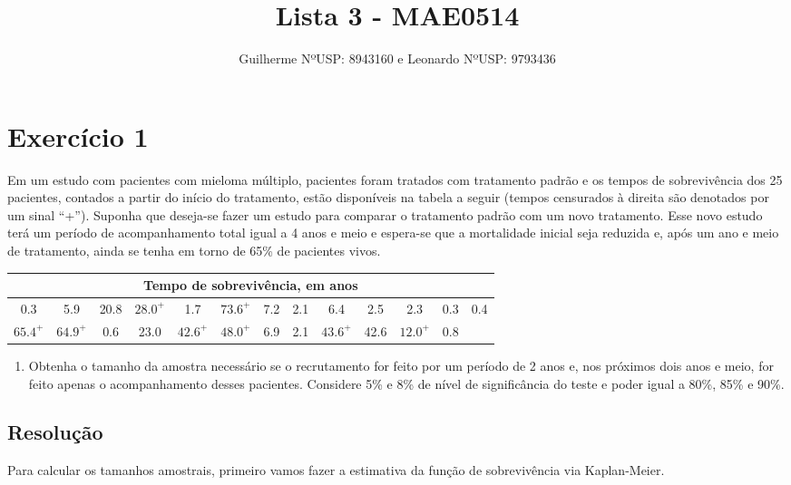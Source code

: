 \documentclass[]{article}
\title{Lista 3 - MAE0514}
\author{Guilherme NºUSP: 8943160 e Leonardo NºUSP: 9793436}
\date{}
\providecommand{\tightlist}{%
  \setlength{\itemsep}{0pt}\setlength{\parskip}{0pt}}
\begin{document}
\maketitle

\section{Exercício 1}\label{exercicio-1}

Em um estudo com pacientes com mieloma múltiplo, pacientes foram
tratados com tratamento padrão e os tempos de sobrevivência dos 25
pacientes, contados a partir do início do tratamento, estão disponíveis
na tabela a seguir (tempos censurados à direita são denotados por um
sinal ``+''). Suponha que deseja-se fazer um estudo para comparar o
tratamento padrão com um novo tratamento. Esse novo estudo terá um
período de acompanhamento total igual a 4 anos e meio e espera-se que a
mortalidade inicial seja reduzida e, após um ano e meio de tratamento,
ainda se tenha em torno de 65\% de pacientes vivos.

\center

\begin{tabular}{ccccccccccccc}
\hline
\multicolumn{13}{c}{Tempo de sobrevivência, em anos} \\ \hline
0.3 & 5.9 & 20.8 & $28.0^{+}$ & 1.7 & $73.6^{+}$ & 7.2 & 2.1 & 6.4 & 2.5 & 2.3 & 0.3 & 0.4 \\
$65.4^{+}$ & $64.9^{+}$ & 0.6 & 23.0 & $42.6^{+}$ & $48.0^{+}$ & 6.9 & 2.1 & $43.6^{+}$ & 42.6 & $12.0^{+}$ & 0.8 &  \\ \hline
\end{tabular}

\justify

\begin{enumerate}
\def\labelenumi{(\alph{enumi})}
\tightlist
\item
  Obtenha o tamanho da amostra necessário se o recrutamento for feito
  por um período de 2 anos e, nos próximos dois anos e meio, for feito
  apenas o acompanhamento desses pacientes. Considere 5\% e 8\% de nível
  de significância do teste e poder igual a 80\%, 85\% e 90\%.
\end{enumerate}

\subsection{Resolução}\label{resolucao}

Para calcular os tamanhos amostrais, primeiro vamos fazer a estimativa
da função de sobrevivência via Kaplan-Meier.
\end{document}
